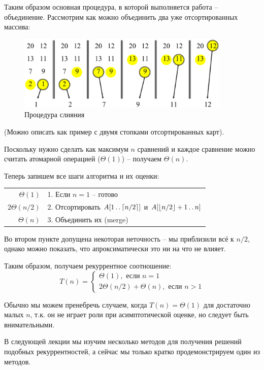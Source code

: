 \documentclass[11pt]{article}
\begin{document}
Таким образом основная процедура, в которой выполняется работа -- объединение.
Рассмотрим как можно объединить два уже отсортированных массива:

\begin{figure}[ht]
  \centering
  \includegraphics[width=4in]{merge.eps}
  \caption{Процедура слияния}
  \label{fig:merge}
\end{figure}

(Можно описать как пример с двумя стопками отсортированных карт).

Поскольку нужно сделать как максимум $n$ сравнений и каждое сравнение можно
считать атомарной операцией ($\Theta(1)$) -- получаем $\Theta(n)$.

Теперь запишем все шаги алгоритма и их оценки:

\begin{tabular}{|r|l|}
$\Theta(1)$    & 1. Если $n = 1$ -- готово  \\
$2\Theta(n/2)$ & 2. Отсортировать $A[1 \mathinner{\ldotp\ldotp} \lceil n/2 \rceil]$ и $A[\lfloor
                    n/2 \rfloor+1 \mathinner{\ldotp\ldotp} n]$ \\
$\Theta(n)$    & 3. Объединить их (merge) 
\end{tabular}

Во втором пункте допущена некоторая неточность -- мы приблизили всё к $n/2$,
однако можно показать, что апроксиматически это ни на что не влияет.

Таким образом, получаем рекуррентное соотношение:
\begin{equation}
  T(n) = \begin{cases}
    \Theta(1), \text{ если } n = 1 \\
    2\Theta(n/2) + \Theta(n), \text{ если } n > 1
    \end{cases}
  \label{eq:recur}
\end{equation}

Обычно мы можем пренебречь случаем, когда $T(n) = \Theta(1)$ для достаточно
малых $n$, т.к. он не играет роли при асимптотической оценке, но следует быть
внимательными.

В следующей лекции мы изучим несколько методов для получения решений подобных
рекуррентностей, а сейчас мы только кратко продемонстрируем один из методов.
\end{document}
